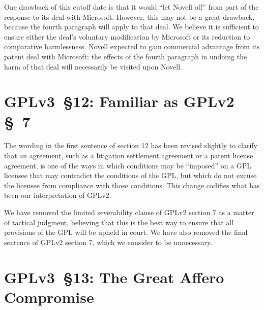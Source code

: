 One drawback of this cutoff date is that it would ``let Novell off''
from part of the response to its deal with Microsoft. However, this may
not be a great drawback, because the fourth paragraph will apply to that
deal. We believe it is sufficient to ensure either the deal's voluntary
modification by Microsoft or its reduction to comparative harmlessness.
Novell expected to gain commercial advantage from its patent deal with
Microsoft; the effects of the fourth paragraph in undoing the harm of
that deal will necessarily be visited upon Novell.


\section{GPLv3~\S12: Familiar as GPLv2 \S~7}


The wording in the first sentence of section 12 has been revised
slightly to clarify that an agreement, such as a litigation settlement
agreement or a patent license agreement, is one of the ways in which
conditions may be ``imposed'' on a GPL licensee that may contradict the
conditions of the GPL, but which do not excuse the licensee from
compliance with those conditions.  This change codifies what has been
our interpretation of GPLv2.  


We have removed the limited severability clause of GPLv2 section 7 as a
matter of tactical judgment, believing that this is the best way to ensure
that all provisions of the GPL will be upheld in court. We have also removed
the final sentence of GPLv2 section 7, which we consider to be unnecessary.

\section{GPLv3~\S13: The Great Affero Compromise}

